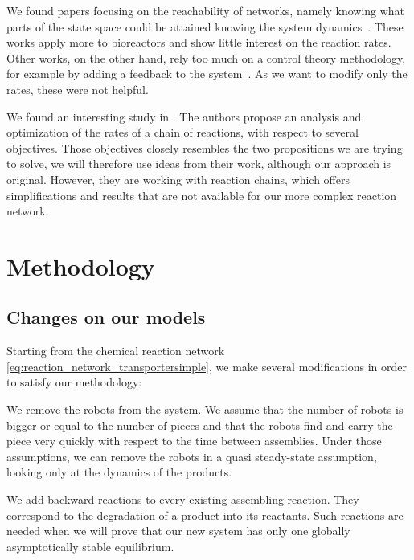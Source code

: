     We found papers focusing on the reachability of networks, namely knowing what parts of the state space could be attained knowing the system dynamics~\cite{Berman:2007p10105, Bastin:1993p10351, Kloetzer:2006p9623, Bastin:1990p10531, Batt:2007p9650}. These works apply more to bioreactors and show little interest on the reaction rates.
    Other works, on the other hand, rely too much on a control theory methodology, for example by adding a feedback to the system~\cite{OteroMuras:2008p10653, Iglesias:2007p9153, Belta:2006p9642}. As we want to modify only the rates, these were not helpful.

    We found an interesting study in \cite{Schuster:1987p11838}. The authors propose an analysis and optimization of the rates of a chain of reactions, with respect to several objectives. Those objectives closely resembles the two propositions we are trying to solve, we will therefore use ideas from their work, although our approach is original. However, they are working with reaction chains, which offers simplifications and results that are not available for our more complex reaction network.


\section{Methodology} %

    \subsection{Changes on our models} %
    \label{sub:changes_on_our_models}

        Starting from the chemical reaction network \eqref{eq:reaction_network_transportersimple}, we make several modifications in order to satisfy our methodology:

        \begin{my_enumerate}
            \item We remove the robots from the system. We assume that the number of robots is bigger or equal to the number of pieces and that the robots find and carry the piece very quickly with respect to the time between assemblies. Under those assumptions, we can remove the robots in a quasi steady-state assumption, looking only at the dynamics of the products.
            \item We add backward reactions to every existing assembling reaction. They correspond to the degradation of a product into its reactants. Such reactions are needed when we will prove that our new system has only one globally asymptotically stable equilibrium.
        \end{my_enumerate}

